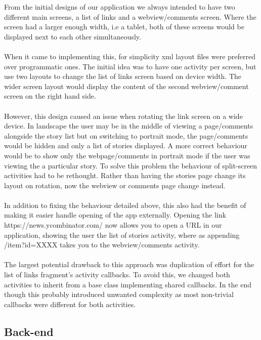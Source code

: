 \documentclass[11pt]{article}
\begin{document}
From the initial designs of our application we always intended to have two different main screens, a list of links and a webview/comments screen. Where the screen had a larger enough width, i.e a tablet, both of these screens would be displayed next to each other simultaneously.
\\
\\
When it came to implementing this, for simplicity xml layout files were preferred over programmatic ones. The initial idea was to have one activity per screen, but use two layouts to change the list of links screen based on device width. The wider screen layout would display the content of the second webview/comment screen on the right hand side.
\\
\\
However, this design caused an issue when rotating the link screen on a wide device. In landscape the user may be in the middle of viewing a page/comments alongside the story list but on switching to portrait mode, the page/comments would be hidden and only a list of stories displayed. A more correct behaviour would be to show only the webpage/comments in portrait mode if the user was viewing the a particular story. To solve this problem the behaviour of split-screen activities had to be rethought. Rather than having the stories page change its layout on rotation, now the webview or comments page change instead.
\\
\\
In addition to fixing the behaviour detailed above, this also had the benefit of making it easier handle opening of the app externally. Opening the link https://news.ycombinator.com/ now allows you to open a URL in our application, showing the user the list of stories activity, where as appending /item?id=XXXX takes you to the webview/comments activity. 
\\
\\
The largest potential drawback to this approach was duplication of effort for the list of links fragment's activity callbacks. To avoid this, we changed both activities to inherit from a base class implementing shared callbacks. In the end though this probably introduced unwanted complexity as most non-trivial callbacks were different for both activities.

\subsection*{Back-end}
\end{document}
